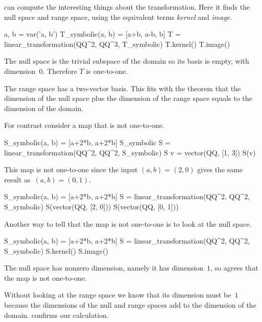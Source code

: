 \Sage{} can compute the interesting things about the transformation.
Here it finds the null space 
and range space, using the equivalent 
terms \textit{kernel} and \textit{image}.
\begin{sageoutput}[d,0,3]
a, b = var('a, b')   
T_symbolic(a, b) = [a+b, a-b, b]         
T = linear_transformation(QQ^2, QQ^3, T_symbolic)
T.kernel()                                       
T.image()                                        
\end{sageoutput}
The null space is the trivial subspace of the domain so
its basis is empty,
with dimension~$0$.
Therefore $T$ is one-to-one.

The range space has a two-vector basis. 
This fits with the theorem that
the dimension of the null space plus the dimension of the 
range space equals to the dimension of the domain.

For contrast consider a map that is not one-to-one.
\begin{sageoutput}
S_symbolic(a, b) = [a+2*b, a+2*b]
S_symbolic
S = linear_transformation(QQ^2, QQ^2, S_symbolic)
S
v = vector(QQ, [1, 3])  
S(v)
\end{sageoutput}
\noindent This map is not one-to-one since the input $(a,b)=(2,0)$  gives
the same result as~$(a,b)=(0,1)$.  
\begin{sageoutput}[d,0,2]
S_symbolic(a, b) = [a+2*b, a+2*b]
S = linear_transformation(QQ^2, QQ^2, S_symbolic)
S(vector(QQ, [2, 0]))
S(vector(QQ, [0, 1]))
\end{sageoutput}
\noindent
Another way to tell that the map is not one-to-one is to look at the 
null space.
\begin{sageoutput}[d,0,2]
S_symbolic(a, b) = [a+2*b, a+2*b]
S = linear_transformation(QQ^2, QQ^2, S_symbolic)
S.kernel()
S.image()
\end{sageoutput}
The null space has nonzero dimension, namely it 
has dimension~$1$,
so \Sage{} agrees that the map is not one-to-one.

Without looking at the range space we know that its dimension must be~$1$ 
because the dimensions of the null and range spaces add to
the dimension of the domain.
\Sage{} confirms our calculation.



